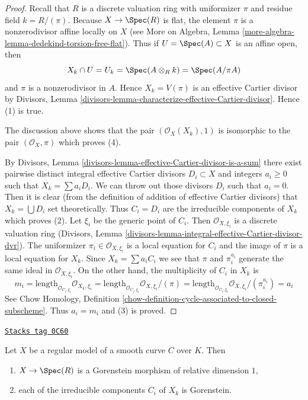 \begin{proof}
Recall that $R$ is a discrete valuation ring with uniformizer $\pi$
and residue field $k = R/(\pi)$. Because $X \to \Spec(R)$ is flat,
the element $\pi$ is a nonzerodivisor affine locally on $X$
(see More on Algebra, Lemma
\ref{more-algebra-lemma-dedekind-torsion-free-flat}). Thus
if $U = \Spec(A) \subset X$ is an affine open, then
$$
X_k \cap U = U_k = \Spec(A \otimes_R k) = \Spec(A/\pi A)
$$
and $\pi$ is a nonzerodivisor in $A$.
Hence $X_k = V(\pi)$ is an effective Cartier divisor by
Divisors, Lemma \ref{divisors-lemma-characterize-effective-Cartier-divisor}.
Hence (1) is true.

\medskip\noindent
The discussion above shows that the pair $(\mathcal{O}_X(X_k), 1)$
is isomorphic to the pair $(\mathcal{O}_X, \pi)$ which proves (4).

\medskip\noindent
By Divisors, Lemma \ref{divisors-lemma-effective-Cartier-divisor-is-a-sum}
there exist pairwise distinct integral effective Cartier divisors
$D_i \subset X$ and integers $a_i \geq 0$ such that $X_k = \sum a_i D_i$.
We can throw out those divisors $D_i$ such that $a_i = 0$. Then it is
clear (from the definition of addition of effective Cartier
divisors) that $X_k = \bigcup D_i$ set theoretically. Thus $C_i = D_i$
are the irreducible components of $X_k$ which proves (2).
Let $\xi_i$ be the generic point of $C_i$.
Then $\mathcal{O}_{X, \xi_i}$ is a discrete valuation ring
(Divisors, Lemma \ref{divisors-lemma-integral-effective-Cartier-divisor-dvr}).
The uniformizer $\pi_i \in \mathcal{O}_{X, \xi_i}$ is a local equation
for $C_i$ and the image of $\pi$ is a local equation for $X_k$.
Since $X_k = \sum a_i C_i$ we see that $\pi$ and $\pi_i^{a_i}$
generate the same ideal in $\mathcal{O}_{X, \xi_i}$.
On the other hand, the multiplicity of $C_i$ in $X_k$ is
$$
m_i = \text{length}_{\mathcal{O}_{C_i, \xi_i}} \mathcal{O}_{X_k, \xi_i} =
\text{length}_{\mathcal{O}_{C_i, \xi_i}} \mathcal{O}_{X, \xi_i}/(\pi) =
\text{length}_{\mathcal{O}_{C_i, \xi_i}} \mathcal{O}_{X, \xi_i}/(\pi_i^{a_i}) =
a_i
$$
See Chow Homology, Definition
\ref{chow-definition-cycle-associated-to-closed-subscheme}.
Thus $a_i = m_i$ and (3) is proved.
\end{proof}

\begin{lemma}[Gorenstein]
\label{models-lemma-gorenstein}
\href{https://stacks.math.columbia.edu/tag/0C60}{\texttt{Stacks tag 0C60}}

Let $X$ be a regular model of a smooth curve $C$ over $K$. Then
\begin{enumerate}
\item $X \to \Spec(R)$ is a Gorenstein morphism of relative dimension $1$,
\item each of the irreducible components $C_i$ of $X_k$ is Gorenstein.
\end{enumerate}
\end{lemma}

